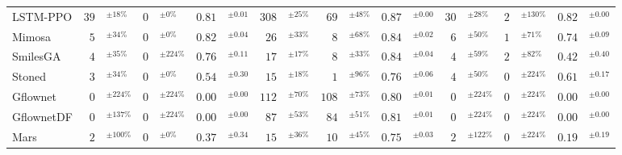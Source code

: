 \begin{tabular}{lr@{}lr@{}lr@{}lr@{}lr@{}lr@{}lr@{}lr@{}lr@{}l}
LSTM-PPO & $39$& $^{\pm18\%}$ & $0$& $^{\pm0\%}$ & $0.81$& $^{\pm0.01}$ & $308$& $^{\pm25\%}$ & $69$& $^{\pm48\%}$ & $0.87$& $^{\pm0.00}$ & $30$& $^{\pm28\%}$ & $2$& $^{\pm130\%}$ & $0.82$& $^{\pm0.00}$ \\
Mimosa & $5$& $^{\pm34\%}$ & $0$& $^{\pm0\%}$ & $0.82$& $^{\pm0.04}$ & $26$& $^{\pm33\%}$ & $8$& $^{\pm68\%}$ & $0.84$& $^{\pm0.02}$ & $6$& $^{\pm50\%}$ & $1$& $^{\pm71\%}$ & $0.74$& $^{\pm0.09}$ \\
SmilesGA & $4$& $^{\pm35\%}$ & $0$& $^{\pm224\%}$ & $0.76$& $^{\pm0.11}$ & $17$& $^{\pm17\%}$ & $8$& $^{\pm33\%}$ & $0.84$& $^{\pm0.04}$ & $4$& $^{\pm59\%}$ & $2$& $^{\pm82\%}$ & $0.42$& $^{\pm0.40}$ \\
Stoned & $3$& $^{\pm34\%}$ & $0$& $^{\pm0\%}$ & $0.54$& $^{\pm0.30}$ & $15$& $^{\pm18\%}$ & $1$& $^{\pm96\%}$ & $0.76$& $^{\pm0.06}$ & $4$& $^{\pm50\%}$ & $0$& $^{\pm224\%}$ & $0.61$& $^{\pm0.17}$ \\
Gflownet & $0$& $^{\pm224\%}$ & $0$& $^{\pm224\%}$ & $0.00$& $^{\pm0.00}$ & $112$& $^{\pm70\%}$ & $108$& $^{\pm73\%}$ & $0.80$& $^{\pm0.01}$ & $0$& $^{\pm224\%}$ & $0$& $^{\pm224\%}$ & $0.00$& $^{\pm0.00}$ \\
GflownetDF & $0$& $^{\pm137\%}$ & $0$& $^{\pm224\%}$ & $0.00$& $^{\pm0.00}$ & $87$& $^{\pm53\%}$ & $84$& $^{\pm51\%}$ & $0.81$& $^{\pm0.01}$ & $0$& $^{\pm224\%}$ & $0$& $^{\pm224\%}$ & $0.00$& $^{\pm0.00}$ \\
Mars & $2$& $^{\pm100\%}$ & $0$& $^{\pm0\%}$ & $0.37$& $^{\pm0.34}$ & $15$& $^{\pm36\%}$ & $10$& $^{\pm45\%}$ & $0.75$& $^{\pm0.03}$ & $2$& $^{\pm122\%}$ & $0$& $^{\pm224\%}$ & $0.19$& $^{\pm0.19}$ \\
\bottomrule
\end{tabular}